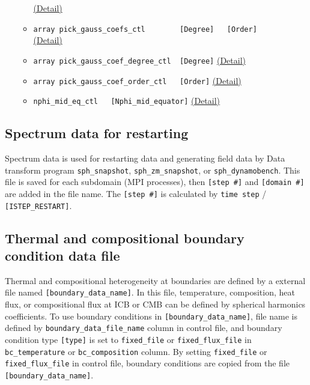 \begin{itemize}
\begin{itemize}
    		\hyperref[href_t:pick_sph_order_ctl]{(Detail)}
	\item \verb|array pick_gauss_coefs_ctl        [Degree]   [Order]| \\
    		\hyperref[href_t:pick_gauss_coefs_ctl]{(Detail)}
	\item \verb|array pick_gauss_coef_degree_ctl  [Degree]|
    		\hyperref[href_t:pick_gauss_coef_degree_ctl]{(Detail)}
	\item \verb|array pick_gauss_coef_order_ctl   [Order]|
    		\hyperref[href_t:pick_gauss_coef_order_ctl]{(Detail)}
%
	\item \verb|nphi_mid_eq_ctl   [Nphi_mid_equator]|
		\label{href_i:nphi_mid_eq_ctl}
    		\hyperref[href_t:nphi_mid_eq_ctl]{(Detail)}
%
	\end{itemize}
\end{itemize}
%
\subsection{Spectrum data for restarting}
Spectrum data is used for restarting data and generating field data by Data transform program \verb|sph_snapshot|, \verb|sph_zm_snapshot|, or \verb|sph_dynamobench|. This file is saved for each subdomain (MPI processes), then \verb|[step #]| and \verb|[domain #]| are added in the file name. The \verb|[step #]| is calculated by \verb|time step| / \verb|[ISTEP_RESTART]|.

\subsection{Thermal and compositional boundary condition data file}\label{sec:boundary_file}
Thermal and compositional heterogeneity at boundaries are defined by a external file named  \verb|[boundary_data_name]|. In this file, temperature, composition, heat flux, or compositional flux at ICB or CMB can be defined by spherical harmonics coefficients. To use boundary conditions in \verb|[boundary_data_name]|, file name is defined by \verb|boundary_data_file_name| column in control file, and boundary condition type \verb|[type]| is set to \verb|fixed_file| or \verb|fixed_flux_file| in \verb|bc_temperature| or \verb|bc_composition| column. By setting \verb|fixed_file| or \verb|fixed_flux_file| in control file, boundary conditions are copied from the file \verb|[boundary_data_name]|.

